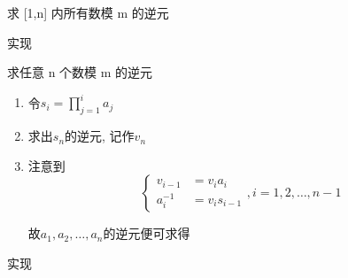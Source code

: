\begin{frame}{求 {[}1,n{]} 内所有数模 m 的逆元}
	\label{cgrunt:algo:inv-multi-seive}


	\only<2->{然后考虑对 \(i\) 做带余除法 \(m=ki+j,j\in[0,i)\cap\Bbb{N}\), 有

	\[
		\begin{aligned}
			ki+j   & \equiv0\pmod m                                        \\
			i^{-1} & \equiv-kj^{-1}\pmod m                                 \\
			i^{-1} & \equiv-\left(\frac{m}{i}\right)(m\bmod i)^{-1}\pmod m
		\end{aligned}
	\]}

\end{frame}


\begin{frame}[fragile]{实现}
\end{frame}


\begin{frame}{求任意 n 个数模 m 的逆元}
	\label{cgrunt:algo:inv-multi-any}


	\begin{enumerate}
		\item<2-> 令\(s_i=\prod_{j=1}^ia_j\)
		\item<3-> 求出\(s_n\)的逆元, 记作\(v_n\)
		\item<4-> 注意到 \[
				\begin{cases}
					v_{i-1}  & =v_ia_i     \\
					a_i^{-1} & =v_is_{i-1}
				\end{cases},i=1,2,\dots,n-1
			\]

			故\(a_1,a_2,\dots,a_n\)的逆元便可求得
	\end{enumerate}

\end{frame}


\begin{frame}{实现}
\end{frame}
